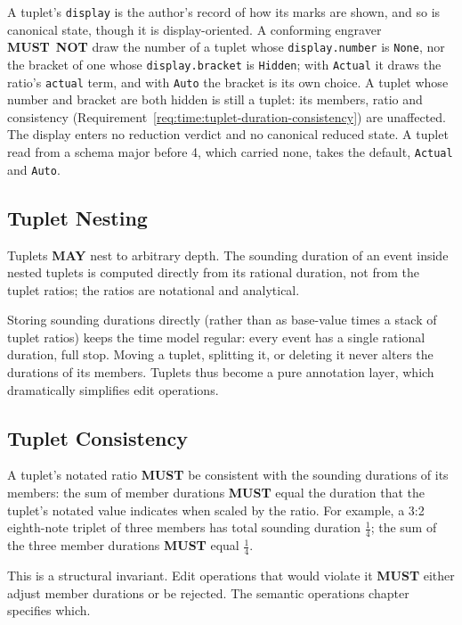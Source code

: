 \documentclass[11pt,letterpaper]{report}
\newcommand{\tablenums}[1]{{\addfontfeatures{Numbers={Lining,Tabular}}#1}}
\newcounter{requirement}[chapter]
\newcommand{\MUST}{\textbf{MUST}}
\newcommand{\MUSTNOT}{\textbf{MUST}\nobreak\ \textbf{NOT}}
\newcommand{\MAY}{\textbf{MAY}}
\begin{document}
\begin{requirement}
  \label{req:time:tuplet-display}
  A tuplet's \texttt{display} is the author's record of how its marks
  are shown, and so is canonical state, though it is display-oriented.
  A conforming engraver \MUSTNOT{} draw the number of a tuplet whose
  \texttt{display.number} is \texttt{None}, nor the bracket of one whose
  \texttt{display.bracket} is \texttt{Hidden}; with \texttt{Actual} it
  draws the ratio's \texttt{actual} term, and with \texttt{Auto} the
  bracket is its own choice. A tuplet whose number and bracket are both
  hidden is still a tuplet: its members, ratio and consistency
  (Requirement~\ref{req:time:tuplet-duration-consistency}) are
  unaffected. The display enters no reduction verdict and no canonical
  reduced state. A tuplet read from a schema major before \tablenums{4},
  which carried none, takes the default, \texttt{Actual} and
  \texttt{Auto}.
\end{requirement}

\subsection{Tuplet Nesting}

Tuplets \MAY{} nest to arbitrary depth. The sounding duration of an
event inside nested tuplets is computed directly from its rational
duration, not from the tuplet ratios; the ratios are notational and
analytical.

\begin{rationale}
  Storing sounding durations directly (rather than as base-value times
  a stack of tuplet ratios) keeps the time model regular: every event
  has a single rational duration, full stop. Moving a tuplet, splitting
  it, or deleting it never alters the durations of its members. Tuplets
  thus become a pure annotation layer, which dramatically simplifies
  edit operations.
\end{rationale}

\subsection{Tuplet Consistency}

\begin{requirement}
  \label{req:time:tuplet-duration-consistency}
  A tuplet's notated ratio \MUST{} be consistent with the sounding
  durations of its members: the sum of member durations \MUST{} equal
  the duration that the tuplet's notated value indicates when scaled
  by the ratio. For example, a 3:2 eighth-note triplet of three members
  has total sounding duration $\frac{1}{4}$; the sum of the three
  member durations \MUST{} equal $\frac{1}{4}$.

  This is a structural invariant. Edit operations that would violate
  it \MUST{} either adjust member durations or be rejected. The
  semantic operations chapter specifies which.
\end{requirement}
\end{document}
